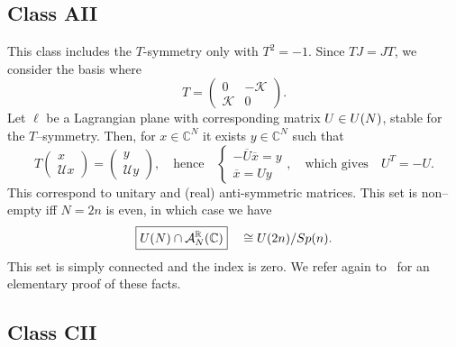\documentclass[11pt]{amsart}
\numberwithin{equation}{section} %
\newcommand\1{{\mathds 1}}
\def\C{{\mathbb C}}
\def\CC{{\mathbb C}}
\def\R{{\mathbb R}}
\def\cA{{\mathcal A}}
\def\cK{{\mathcal K}}
\def\cU{{\mathcal U}}
\def\U{{\rm U}}
\def\Sp{{\rm Sp}}
\begin{document}
\subsection{Class AII}
\label{sec:class_AII}

This class includes the $T$-symmetry only with $T^2=-1$. Since $TJ=JT$, we consider the basis where 
$$
T =  \begin{pmatrix}	0 & -\cK \\
	\cK & 0
\end{pmatrix}.
$$
Let $\ell$ be a Lagrangian plane with corresponding matrix $U \in \U(N)$, stable for the $T$--symmetry. Then, for $x \in \CC^N$ it exists $y \in \CC^N$ such that 
$$
T \begin{pmatrix}	x  \\	\cU x \end{pmatrix} = \begin{pmatrix}	y  \\	\cU y \end{pmatrix},
\quad \text{hence} \quad
\begin{cases}
    - \overline{U} \overline{x} = y \\
    \overline{x} = Uy
\end{cases}, \quad \text{which gives} \quad U^T = -U.
$$
This correspond to unitary and (real) anti-symmetric matrices. This set is non--empty iff $N = 2n$ is even,  in which case we have
\[
    \boxed{ \U(N) \cap \cA_N^\R(\C)} \quad  \cong \U(2n) / \Sp(n).
\]
This set is simply connected and the index is zero. We refer again to~\cite[Thm 4.7 and Cor. A.4]{GonMonPer-22} for an elementary proof of these facts. 

\subsection{Class CII} 
\label{sec:class_CII}
\end{document}
